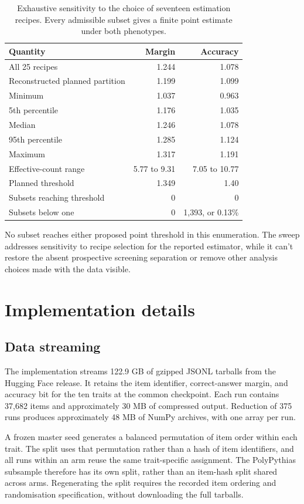 \begin{table}[htbp]
\centering\small
\caption{Exhaustive sensitivity to the choice of seventeen estimation recipes. Every admissible subset gives a finite point estimate under both phenotypes.}
\label{tab:original14}
\begin{tabular}{lrr}\hline
Quantity & Margin & Accuracy\\\hline
All 25 recipes & 1.244 & 1.078\\
Reconstructed planned partition & 1.199 & 1.099\\
Minimum & 1.037 & 0.963\\
5th percentile & 1.176 & 1.035\\
Median & 1.246 & 1.078\\
95th percentile & 1.285 & 1.124\\
Maximum & 1.317 & 1.191\\
Effective-count range & 5.77 to 9.31 & 7.05 to 10.77\\
Planned threshold & 1.349 & 1.40\\
Subsets reaching threshold & 0 & 0\\
Subsets below one & 0 & 1,393, or 0.13\%\\\hline
\end{tabular}
\end{table}

No subset reaches either proposed point threshold in this enumeration. The sweep addresses sensitivity to recipe selection for the reported estimator, while it can't restore the absent prospective screening separation or remove other analysis choices made with the data visible.

\section{Implementation details}
\label{app:implementation}

\subsection{Data streaming}
The implementation streams 122.9 GB of gzipped JSONL tarballs from the Hugging Face release. It retains the item identifier, correct-answer margin, and accuracy bit for the ten traits at the common checkpoint. Each run contains 37,682 items and approximately 30 MB of compressed output. Reduction of 375 runs produces approximately 48 MB of NumPy archives, with one array per run.

A frozen master seed generates a balanced permutation of item order within each trait. The split uses that permutation rather than a hash of item identifiers, and all runs within an arm reuse the same trait-specific assignment. The PolyPythias subsample therefore has its own split, rather than an item-hash split shared across arms. Regenerating the split requires the recorded item ordering and randomisation specification, without downloading the full tarballs.

